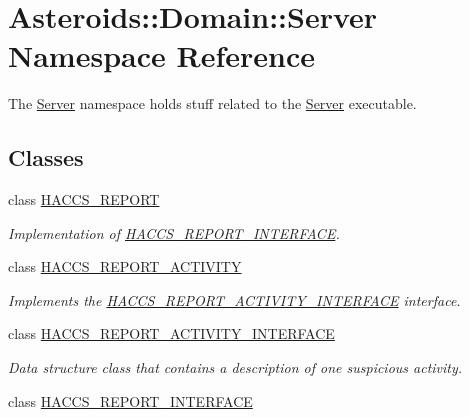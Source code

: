 \hypertarget{namespaceAsteroids_1_1Domain_1_1Server}{}\section{Asteroids\+:\+:Domain\+:\+:Server Namespace Reference}
\label{namespaceAsteroids_1_1Domain_1_1Server}


The \hyperlink{namespaceAsteroids_1_1Domain_1_1Server}{Server} namespace holds stuff related to the \hyperlink{namespaceAsteroids_1_1Domain_1_1Server}{Server} executable.  


\subsection*{Classes}
\begin{DoxyCompactItemize}
\item 
class \hyperlink{classAsteroids_1_1Domain_1_1Server_1_1HACCS__REPORT}{H\+A\+C\+C\+S\+\_\+\+R\+E\+P\+O\+RT}
\begin{DoxyCompactList}\small\item\em Implementation of \hyperlink{classAsteroids_1_1Domain_1_1Server_1_1HACCS__REPORT__INTERFACE}{H\+A\+C\+C\+S\+\_\+\+R\+E\+P\+O\+R\+T\+\_\+\+I\+N\+T\+E\+R\+F\+A\+CE}. \end{DoxyCompactList}\item 
class \hyperlink{classAsteroids_1_1Domain_1_1Server_1_1HACCS__REPORT__ACTIVITY}{H\+A\+C\+C\+S\+\_\+\+R\+E\+P\+O\+R\+T\+\_\+\+A\+C\+T\+I\+V\+I\+TY}
\begin{DoxyCompactList}\small\item\em Implements the \hyperlink{classAsteroids_1_1Domain_1_1Server_1_1HACCS__REPORT__ACTIVITY__INTERFACE}{H\+A\+C\+C\+S\+\_\+\+R\+E\+P\+O\+R\+T\+\_\+\+A\+C\+T\+I\+V\+I\+T\+Y\+\_\+\+I\+N\+T\+E\+R\+F\+A\+CE} interface. \end{DoxyCompactList}\item 
class \hyperlink{classAsteroids_1_1Domain_1_1Server_1_1HACCS__REPORT__ACTIVITY__INTERFACE}{H\+A\+C\+C\+S\+\_\+\+R\+E\+P\+O\+R\+T\+\_\+\+A\+C\+T\+I\+V\+I\+T\+Y\+\_\+\+I\+N\+T\+E\+R\+F\+A\+CE}
\begin{DoxyCompactList}\small\item\em Data structure class that contains a description of one suspicious activity. \end{DoxyCompactList}\item 
class \hyperlink{classAsteroids_1_1Domain_1_1Server_1_1HACCS__REPORT__INTERFACE}{H\+A\+C\+C\+S\+\_\+\+R\+E\+P\+O\+R\+T\+\_\+\+I\+N\+T\+E\+R\+F\+A\+CE}

\end{DoxyCompactItemize}
